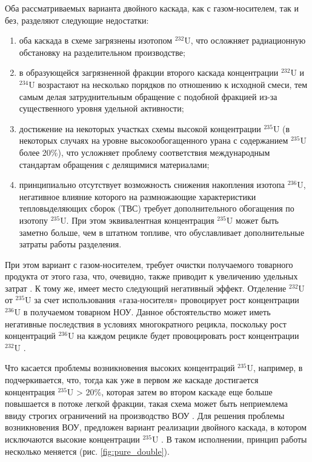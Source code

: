 Оба рассматриваемых варианта двойного каскада, как с газом-носителем, так и без, разделяют следующие недостатки:
\begin{enumerate}
  \item оба каскада в схеме загрязнены изотопом $^{232}$U, что осложняет радиационную обстановку на разделительном производстве;
  \item в образующейся загрязненной фракции второго каскада концентрации $^{232}$U и $^{234}$U возрастают на несколько порядков по отношению к исходной смеси, тем самым делая затруднительным обращение с подобной фракцией из-за существенного уровня удельной активности;
  \item достижение на некоторых участках схемы высокой концентрации $^{235}$U (в некоторых случаях на уровне высокообогащенного урана с содержанием $^{235}$U более 20\%), что усложняет проблему соответствия международным стандартам обращения с делящимися материалами;
  \item принципиально отсутствует возможность снижения накопления изотопа $^{236}$U, негативное влияние которого на размножающие характеристики тепловыделяющих сборок (ТВС) требует дополнительного обогащения по изотопу $^{235}$U. При этом эквивалентная концентрация $^{235}$U может быть заметно больше, чем в штатном топливе, что обуславливает дополнительные затраты работы разделения.
\end{enumerate}

При этом вариант с газом-носителем, требует очистки получаемого товарного продукта от этого газа, что, очевидно, также приводит к увеличению удельных затрат \cite{smirnovKaskadnyeShemyZadachah2012}.
К тому же, имеет место следующий негативный эффект. Отделение $^{232}$U от $^{235}$U за счет использования «газа-носителя» провоцирует рост концентрации $^{236}$U в получаемом товарном НОУ. Данное обстоятельство может иметь негативные последствия в условиях многократного рецикла, поскольку рост концентраций $^{236}$U на каждом рецикле будет провоцировать рост концентрации $^{232}$U \cite{dudnikovInfluence236UEfficacy2016}.


Что касается проблемы возникновения высоких концентраций $^{235}$U, например, в \cite{palkinPurificationReprocessedUranium2016} подчеркивается, что, тогда как уже в первом же каскаде достигается концентрация $^{235}$U > 20\%, которая затем во втором каскаде еще больше повышается в потоке легкой фракции, такая схема может быть неприемлема ввиду строгих ограничений на производство ВОУ \cite{ManagementHighEnriched2005}. Для решения проблемы возникновения ВОУ, предложен вариант реализации двойного каскада, в котором исключаются высокие концентрации $^{235}$U \cite{zhurinSposobIzotopnogoVosstanovleniya2010}. В таком исполнении, принцип работы несколько меняется (рис. \ref{fig:pure_double}).

